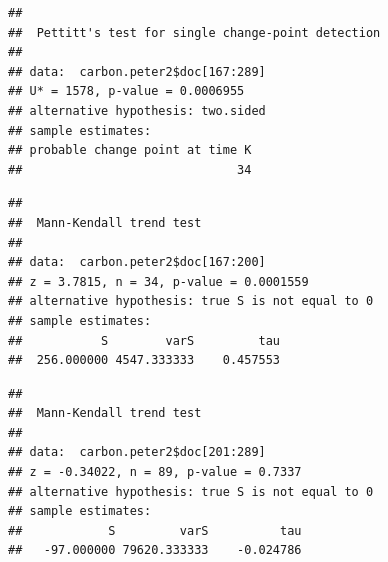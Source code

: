 \documentclass[12pt,]{article}
\newenvironment{Shaded}{\begin{snugshade}}{\end{snugshade}}
\newcommand{\KeywordTok}[1]{\textcolor[rgb]{0.13,0.29,0.53}{\textbf{#1}}}
\newcommand{\DecValTok}[1]{\textcolor[rgb]{0.00,0.00,0.81}{#1}}
\newcommand{\CommentTok}[1]{\textcolor[rgb]{0.56,0.35,0.01}{\textit{#1}}}
\newcommand{\OperatorTok}[1]{\textcolor[rgb]{0.81,0.36,0.00}{\textbf{#1}}}
\newcommand{\NormalTok}[1]{#1}
\begin{document}
\begin{verbatim}
## 
##  Pettitt's test for single change-point detection
## 
## data:  carbon.peter2$doc[167:289]
## U* = 1578, p-value = 0.0006955
## alternative hypothesis: two.sided
## sample estimates:
## probable change point at time K 
##                              34
\end{verbatim}

\begin{Shaded}
\end{Shaded}

\begin{verbatim}
## 
##  Mann-Kendall trend test
## 
## data:  carbon.peter2$doc[167:200]
## z = 3.7815, n = 34, p-value = 0.0001559
## alternative hypothesis: true S is not equal to 0
## sample estimates:
##           S        varS         tau 
##  256.000000 4547.333333    0.457553
\end{verbatim}

\begin{Shaded}
\end{Shaded}

\begin{verbatim}
## 
##  Mann-Kendall trend test
## 
## data:  carbon.peter2$doc[201:289]
## z = -0.34022, n = 89, p-value = 0.7337
## alternative hypothesis: true S is not equal to 0
## sample estimates:
##            S         varS          tau 
##   -97.000000 79620.333333    -0.024786
\end{verbatim}

\begin{Shaded}
\end{Shaded}
\end{document}
